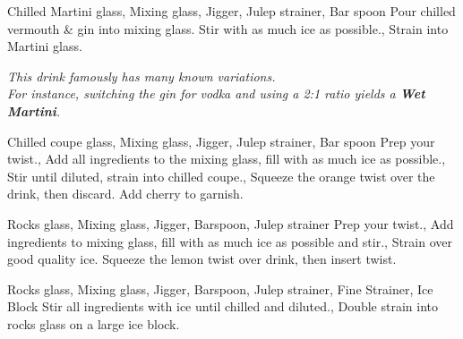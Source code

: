 \documentclass[../main.tex]{subfiles}
\begin{document}

{Chilled Martini glass, Mixing glass, Jigger, Julep strainer, Bar spoon}
{
    {Pour chilled vermouth \& gin into mixing glass. Stir with as much ice as possible.}, 
    Strain into Martini glass.
}

\begin{center}
    \textit{This drink famously has many known variations.\\
    For instance, switching the gin for vodka and using a 2:1 ratio yields a \textbf{Wet Martini}.}
\end{center}

\cocktailDivider

{Chilled coupe glass, Mixing glass, Jigger, Julep strainer, Bar spoon}
{
	{Prep your twist.},
	{Add all ingredients to the mixing glass, fill with as much ice as possible.},
	{Stir until diluted, strain into chilled coupe.},
	{Squeeze the orange twist over the drink, then discard. Add cherry to garnish.}
}

\cocktailDivider

{Rocks glass, Mixing glass, Jigger, Barspoon, Julep strainer}
{
	Prep your twist.,
	{Add ingredients to mixing glass, fill with as much ice as possible and stir.},
    {Strain over good quality ice.}
    {Squeeze the lemon twist over drink, then insert twist.}
}

\cocktailDivider

{Rocks glass, Mixing glass, Jigger, Barspoon, Julep strainer, Fine Strainer, Ice Block}
{
    Stir all ingredients with ice until chilled and diluted.,
    Double strain into rocks glass on a large ice block.
}
\end{document}
